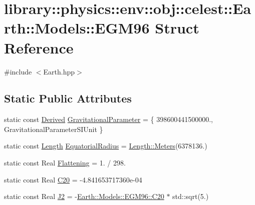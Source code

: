 \hypertarget{structlibrary_1_1physics_1_1env_1_1obj_1_1celest_1_1_earth_1_1_models_1_1_e_g_m96}{}\section{library\+:\+:physics\+:\+:env\+:\+:obj\+:\+:celest\+:\+:Earth\+:\+:Models\+:\+:E\+G\+M96 Struct Reference}
\label{structlibrary_1_1physics_1_1env_1_1obj_1_1celest_1_1_earth_1_1_models_1_1_e_g_m96}


{\ttfamily \#include $<$Earth.\+hpp$>$}

\subsection*{Static Public Attributes}
\begin{DoxyCompactItemize}
\item 
static const \hyperlink{classlibrary_1_1physics_1_1units_1_1_derived}{Derived} \hyperlink{structlibrary_1_1physics_1_1env_1_1obj_1_1celest_1_1_earth_1_1_models_1_1_e_g_m96_a1a614eedba93c6a4d00f3ded244ae508}{Gravitational\+Parameter} = \{ 398600441500000., Gravitational\+Parameter\+S\+I\+Unit \}
\item 
static const \hyperlink{classlibrary_1_1physics_1_1units_1_1_length}{Length} \hyperlink{structlibrary_1_1physics_1_1env_1_1obj_1_1celest_1_1_earth_1_1_models_1_1_e_g_m96_a5f9d7b69bacc155c27ae36f6a7d3de6e}{Equatorial\+Radius} = \hyperlink{classlibrary_1_1physics_1_1units_1_1_length_ad523a3737d5c3f23a64588eac83f2148}{Length\+::\+Meters}(6378136.)
\item 
static const Real \hyperlink{structlibrary_1_1physics_1_1env_1_1obj_1_1celest_1_1_earth_1_1_models_1_1_e_g_m96_a809711e3370147668df2c97efba67e07}{Flattening} = 1. / 298.
\item 
static const Real \hyperlink{structlibrary_1_1physics_1_1env_1_1obj_1_1celest_1_1_earth_1_1_models_1_1_e_g_m96_a37ac9f9643bf74cc47fa23b102cecf34}{C20} = -\/4.\+841653717360e-\/04
\item 
static const Real \hyperlink{structlibrary_1_1physics_1_1env_1_1obj_1_1celest_1_1_earth_1_1_models_1_1_e_g_m96_a3c5d23e2538cbb0ddbb426e87c988349}{J2} = -\/\hyperlink{structlibrary_1_1physics_1_1env_1_1obj_1_1celest_1_1_earth_1_1_models_1_1_e_g_m96_a37ac9f9643bf74cc47fa23b102cecf34}{Earth\+::\+Models\+::\+E\+G\+M96\+::\+C20} $\ast$ std\+::sqrt(5.)
\end{DoxyCompactItemize}


